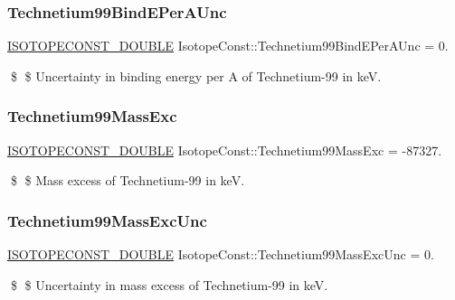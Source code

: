 \subsubsection{\texorpdfstring{Technetium99\+Bind\+E\+Per\+A\+Unc}{Technetium99BindEPerAUnc}}
{\footnotesize\ttfamily \mbox{\hyperlink{group___isotope_const-_macros_ga8f45a7272ce02c0b4c65c44636ed719a}{I\+S\+O\+T\+O\+P\+E\+C\+O\+N\+S\+T\+\_\+\+D\+O\+U\+B\+LE}} Isotope\+Const\+::\+Technetium99\+Bind\+E\+Per\+A\+Unc = 0.}

\$ \$ Uncertainty in binding energy per A of Technetium-\/99 in keV. \mbox{\label{group___isotope_const-_technetium-_tc99_ga751644445fbdc8e4e30a98dc8b0a08a7}} 
\subsubsection{\texorpdfstring{Technetium99\+Mass\+Exc}{Technetium99MassExc}}
{\footnotesize\ttfamily \mbox{\hyperlink{group___isotope_const-_macros_ga8f45a7272ce02c0b4c65c44636ed719a}{I\+S\+O\+T\+O\+P\+E\+C\+O\+N\+S\+T\+\_\+\+D\+O\+U\+B\+LE}} Isotope\+Const\+::\+Technetium99\+Mass\+Exc = -\/87327.}

\$ \$ Mass excess of Technetium-\/99 in keV. \mbox{\label{group___isotope_const-_technetium-_tc99_ga7565f5bc74f4131fae98aad6aca71fa9}} 
\subsubsection{\texorpdfstring{Technetium99\+Mass\+Exc\+Unc}{Technetium99MassExcUnc}}
{\footnotesize\ttfamily \mbox{\hyperlink{group___isotope_const-_macros_ga8f45a7272ce02c0b4c65c44636ed719a}{I\+S\+O\+T\+O\+P\+E\+C\+O\+N\+S\+T\+\_\+\+D\+O\+U\+B\+LE}} Isotope\+Const\+::\+Technetium99\+Mass\+Exc\+Unc = 0.}

\$ \$ Uncertainty in mass excess of Technetium-\/99 in keV. \mbox{\label{group___isotope_const-_technetium-_tc99_gac093abb7542dc31b86ff8f2778307dc5}} 
